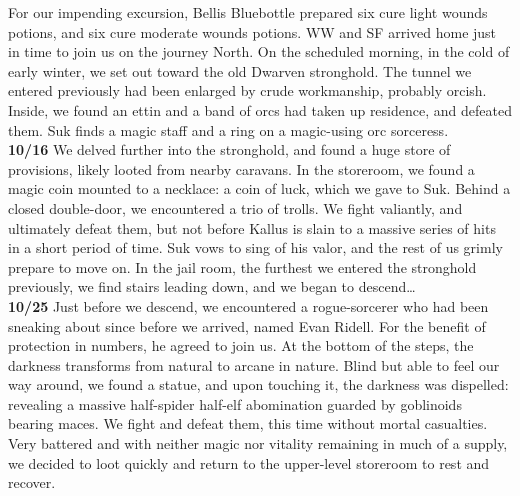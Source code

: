 \documentclass[letterpaper]{article}
\begin{document}
\noindent For our impending excursion, Bellis Bluebottle prepared six cure light wounds potions, and six cure moderate wounds potions.  WW and SF arrived home just in time to join us on the journey North.  On the scheduled morning, in the cold of early winter, we set out toward the old Dwarven stronghold.  The tunnel we entered previously had been enlarged by crude workmanship, probably orcish.  Inside, we found an ettin and a band of orcs had taken up residence, and defeated them. Suk finds a magic staff and a ring on a magic-using orc sorceress. \\

\noindent \textbf{10/16} We delved further into the stronghold, and found a huge store of provisions, likely looted from nearby caravans.  In the storeroom, we found a magic coin mounted to a necklace: a coin of luck, which we gave to Suk.  Behind a closed double-door, we encountered a trio of trolls.  We fight valiantly, and ultimately defeat them, but not before Kallus is slain to a massive series of hits in a short period of time. Suk vows to sing of his valor, and the rest of us grimly prepare to move on.  In the jail room, the furthest we entered the stronghold previously, we find stairs leading down, and we began to descend\ldots \\

\noindent \textbf{10/25} Just before we descend, we encountered a rogue-sorcerer who had been sneaking about since before we arrived, named Evan Ridell. For the benefit of protection in numbers, he agreed to join us.  At the bottom of the steps, the darkness transforms from natural to arcane in nature.  Blind but able to feel our way around, we found a statue, and upon touching it, the darkness was dispelled: revealing a massive half-spider half-elf abomination guarded by goblinoids bearing maces. We fight and defeat them, this time without mortal casualties. Very battered and with neither magic nor vitality remaining in much of a supply, we decided to loot quickly and return to the upper-level storeroom to rest and recover.  \\
\end{document}
